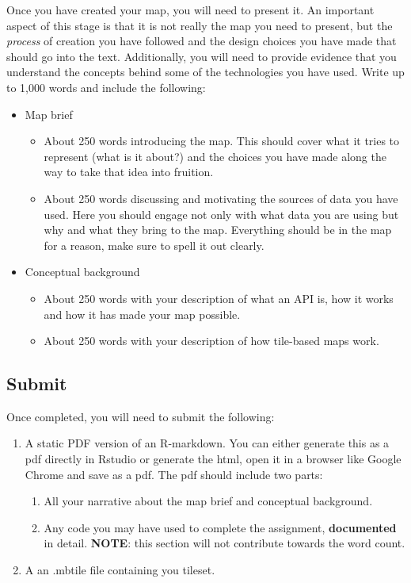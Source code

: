 \documentclass[
  letterpaper,
  DIV=11,
  numbers=noendperiod]{scrreprt}
\begin{document}
Once you have created your map, you will need to present it. An
important aspect of this stage is that it is not really the map you need
to present, but the \emph{process} of creation you have followed and the
design choices you have made that should go into the text. Additionally,
you will need to provide evidence that you understand the concepts
behind some of the technologies you have used. Write up to 1,000 words
and include the following:

\begin{itemize}
\item
  Map brief

  \begin{itemize}
  \item
    About 250 words introducing the map. This should cover what it tries
    to represent (what is it about?) and the choices you have made along
    the way to take that idea into fruition.
  \item
    About 250 words discussing and motivating the sources of data you
    have used. Here you should engage not only with what data you are
    using but why and what they bring to the map. Everything should be
    in the map for a reason, make sure to spell it out clearly.
  \end{itemize}
\item
  Conceptual background

  \begin{itemize}
  \item
    About 250 words with your description of what an API is, how it
    works and how it has made your map possible.
  \item
    About 250 words with your description of how tile-based maps work.
  \end{itemize}
\end{itemize}

\subsection*{Submit}\label{submit}

Once completed, you will need to submit the following:

\begin{enumerate}
\def\labelenumi{\arabic{enumi}.}
\item
  A static PDF version of an R-markdown. You can either generate this as
  a pdf directly in Rstudio or generate the html, open it in a browser
  like Google Chrome and save as a pdf. The pdf should include two
  parts:

  \begin{enumerate}
  \def\labelenumii{\arabic{enumii}.}
  \item
    All your narrative about the map brief and conceptual background.
  \item
    Any code you may have used to complete the assignment,
    \textbf{documented} in detail. \textbf{NOTE}: this section will not
    contribute towards the word count.
  \end{enumerate}
\item
  A an .mbtile file containing you tileset.
\end{enumerate}
\end{document}
